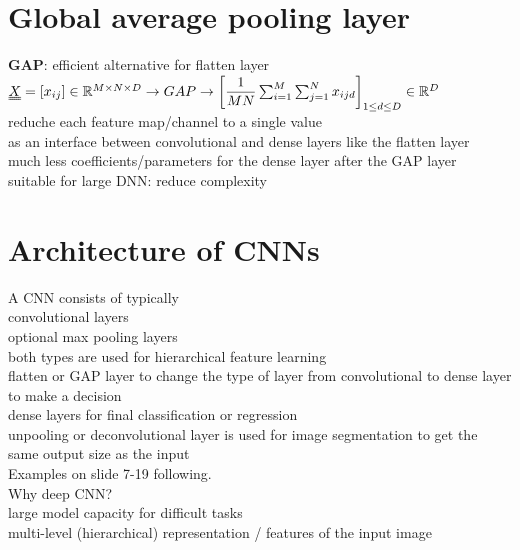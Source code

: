 \section{Global average pooling layer}
\textbf{GAP}: efficient alternative for flatten layer \\
$  \X = [x_{ij}] \in \R^{M \times N \times D} \rightarrow GAP \rightarrow \left[ \dfrac{1}{MN} \sum_{i=1}^{M} \sum_{j=1}^{N} x_{ijd} \right]   _{1 \leq d \le D} \in \R^D$\\
\textbullet reduche each feature map/channel to a single value \\
\textbullet as an interface between convolutional and dense layers like the flatten layer\\
\textbullet much less coefficients/parameters for the dense layer after the GAP layer\\
\textbullet suitable for large DNN: reduce complexity
\section{Architecture of CNNs}
A CNN consists of typically \\
\textbullet convolutional layers \\
\textbullet optional max pooling layers \\
both types are used for hierarchical feature learning \\
\textbullet flatten or GAP layer to change the type of layer from convolutional to dense layer to make a decision \\
\textbullet dense layers for final classification or regression \\
\textbullet unpooling or deconvolutional layer is used for image segmentation to get the same output size as the input \\
Examples on slide 7-19 following.\\
Why deep CNN?\\
\textbullet large model capacity for difficult tasks\\
\textbullet multi-level (hierarchical) representation / features of the input image \\
 \\







